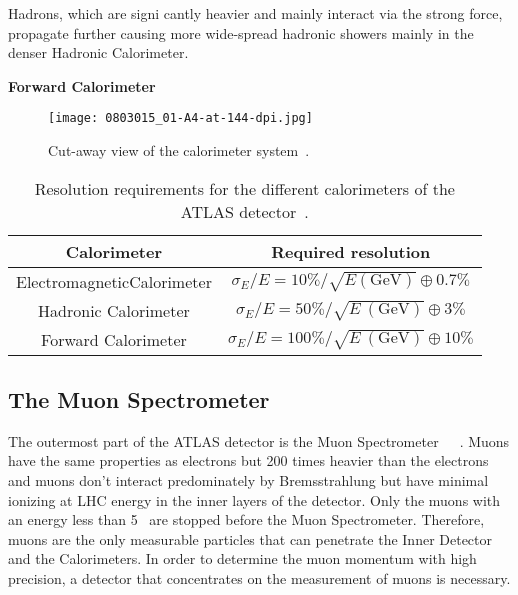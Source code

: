 Hadrons, which are signi cantly heavier and mainly interact via the strong force, propagate further causing more wide-spread hadronic showers mainly in the denser Hadronic Calorimeter.

\noindent \textbf{Forward Calorimeter}


\begin{figure}[htbp]
\begin{center}
\texttt{[image: 0803015\_01-A4-at-144-dpi.jpg]}
\caption{Cut-away view of the calorimeter system~\cite{1748-0221-3-08-S08003}.}
\label{fig:calorimeter}
\end{center}
\end{figure}

\begin{table}[htbp]
\begin{center}
\begin{tabular}{cc}
\hline
\hline
Calorimeter & Required resolution\\
\hline
ElectromagneticCalorimeter & $\sigma_{E}/E = 10\% / \sqrt{E\mathrm{ (GeV)}} \oplus 0.7\%$\\
Hadronic Calorimeter & $\sigma_{E}/E = 50\% / \sqrt{E~\mathrm{(GeV)}} \oplus 3\%$\\
Forward Calorimeter & $\sigma_{E}/E = 100\% / \sqrt{E~\mathrm{(GeV)}} \oplus 10\%$\\
\hline
\hline
\end{tabular}
\end{center}
\caption{Resolution requirements for the different calorimeters of the ATLAS detector~\cite{1748-0221-3-08-S08003}.}
\label{tab:}
\end{table}%







\subsection{The Muon Spectrometer} \label{subsec:the_muon_spectrometer}

The outermost part of the ATLAS detector is the Muon Spectrometer~\cite{1748-0221-3-08-S08003}~\cite{Palestini:681459}~\cite{0910.2767}.
Muons have the same properties as electrons but 200 times heavier than the electrons and muons don't interact predominately by Bremsstrahlung but have minimal ionizing at LHC energy in the inner layers of the detector.
Only the muons with an energy less than 5~{\GeV} are stopped before the Muon Spectrometer.
Therefore, muons are the only measurable particles that can penetrate the Inner Detector and the Calorimeters.
In order to determine the muon momentum with high precision, a detector that concentrates on the measurement of muons is necessary.

